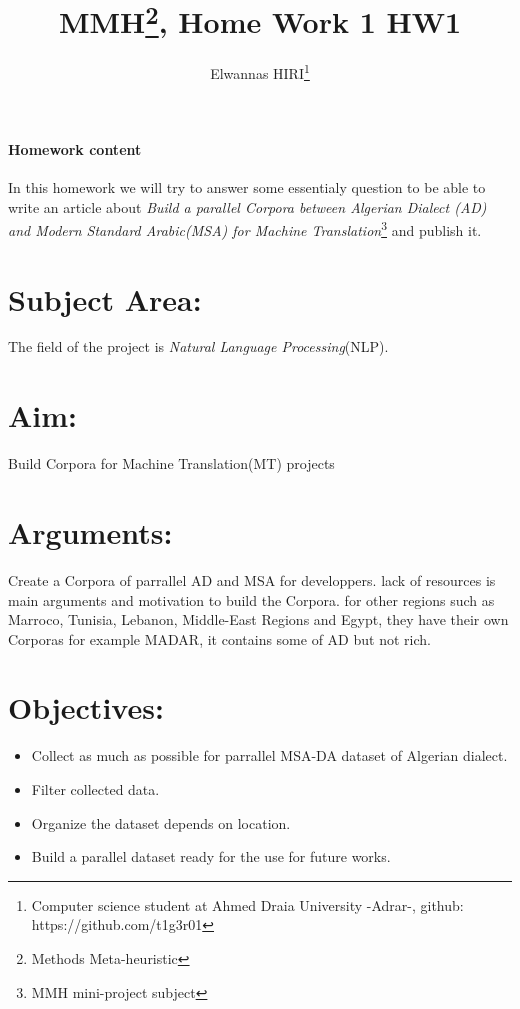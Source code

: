 \documentclass[12pt]{article}[]
\begin{document}
\title{MMH\thanks{Methods Meta-heuristic}, Home Work 1 HW1}
\author{Elwannas HIRI\thanks{Computer science student at Ahmed Draia University -Adrar-, github: https://github.com/t1g3r01}}
\maketitle
\paragraph{Homework content}
In this homework we will try to answer some essentialy question to be able to write an article about \textit{Build a  parallel Corpora between Algerian Dialect (AD) and Modern Standard Arabic(MSA) for Machine Translation}\footnote{MMH mini-project subject} and publish it. 
\section{Subject Area:}
The field of the project is \textit{Natural Language Processing}(NLP).
\section{Aim:}
Build Corpora for Machine Translation(MT) projects
\section{Arguments:}
Create a Corpora of parrallel AD and MSA for developpers. lack of resources is main arguments and motivation to build the Corpora.
for other regions such as Marroco, Tunisia, Lebanon, Middle-East Regions and Egypt, they have their own Corporas for example MADAR, it contains some of AD but not rich.
\section{Objectives:}
\begin{itemize}
	\item Collect as much as possible for parrallel MSA-DA dataset of Algerian dialect.
	\item Filter collected data.	
	\item Organize the dataset depends on location. 
	\item Build a parallel dataset ready for the use for future works.	
	
\end{itemize}  
\end{document}
